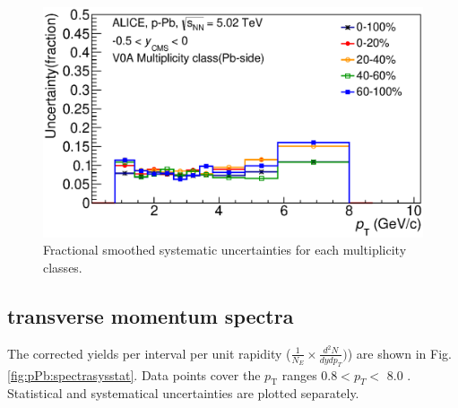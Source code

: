 \begin{figure}[htbp]
\begin{center}
\includegraphics[width=12.0cm]{./Version1/FigChapter5/Systematic/AfterSmooth.eps}
\caption{Fractional smoothed systematic uncertainties for each multiplicity classes.} 
\label{fig:ASsyserrortot}
\end{center}
\end{figure}


\newpage
\subsection{\xis transverse momentum spectra}\label{sec:pPb:spectra} 
The corrected yields per \pt interval per unit rapidity ($\frac{1}{N_{E}}\times \frac{d^2N}{dydp_{T}})$) are shown in Fig.\ref{fig:pPb:spectrasysstat}. Data points cover the $p_{\mathrm{T}}$ ranges 0.8$ < p_{T} <$ 8.0 \gmom. Statistical and systematical uncertainties are plotted separately. 

